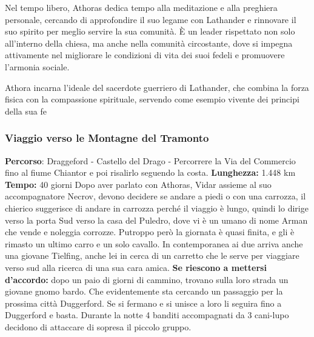 \documentclass{article}
\begin{document}
                  Nel tempo libero, Athoras dedica tempo alla meditazione e alla preghiera personale, cercando di approfondire il suo legame con Lathander e rinnovare il suo spirito per meglio servire la sua comunità. È un leader rispettato non solo all'interno della chiesa, ma anche nella comunità circostante, dove si impegna attivamente nel migliorare le condizioni di vita dei suoi fedeli e promuovere l'armonia sociale.
                  
                  Athora incarna l'ideale del sacerdote guerriero di Lathander, che combina la forza fisica con la compassione spirituale, servendo come esempio vivente dei principi della sua fe
    \subsubsection{Viaggio verso le Montagne del Tramonto}
        \textbf{Percorso}: Draggeford - Castello del Drago - Percorrere la Via del Commercio fino al fiume Chiantor e poi risalirlo seguendo la costa. 
        \textbf{Lunghezza:} 1.448 km
        \textbf{Tempo: }40 giorni
        Dopo aver parlato con Athoras, Vidar assieme al suo accompagnatore Necrov, devono decidere se andare a piedi o con una carrozza, il chierico suggerisce di andare in carrozza perché il viaggio è lungo, quindi lo dirige verso la porta Sud verso la casa del Puledro, dove vi è un umano di nome Arman che vende e noleggia corrozze. Putroppo però la giornata è quasi finita, e gli è rimasto un ultimo carro e un solo cavallo. In contemporanea ai due arriva anche una giovane Tielfing, anche lei in cerca di un carretto che le serve per viaggiare verso sud alla ricerca di una sua cara amica.
        \textbf{Se riescono a mettersi d'accordo: } dopo un paio di giorni di cammino, trovano sulla loro strada un giovane gnomo bardo. Che evidentemente sta cercando un passaggio per la prossima città Duggerford. Se si fermano e si unisce a loro li seguira fino a Duggerford e basta. 
            Durante la notte 4 banditi accompagnati da 3 cani-lupo decidono di attaccare di sopresa il piccolo gruppo. 
            
\end{document}
